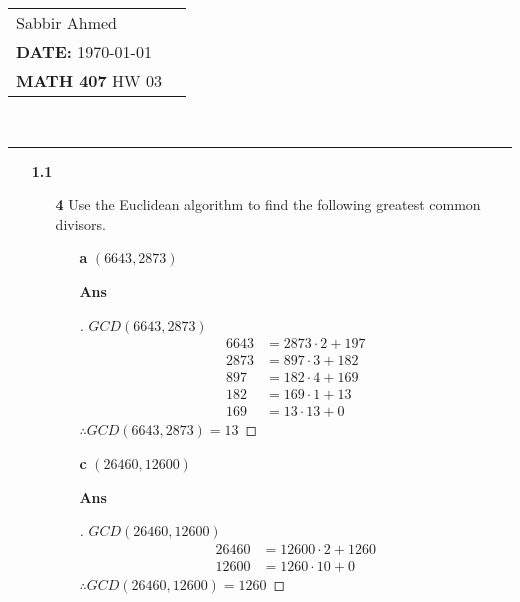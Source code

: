 \documentclass[paper=usletter, fontsize=12pt]{article}
\newcommand{\documentinfo}[5]{
    \begin{centering}
        \parbox{2in}{
        \begin{spacing}{1}
            \begin{flushleft}
                \begin{tabular}{l l}
                    #1 \\
                    #2 \\
                    #3 \\
                \end{tabular}\\
                \rule{\textwidth}{1pt}
            \end{flushleft}
        \end{spacing}
        }
    \end{centering}
}
\begin{document}
    \documentinfo{Sabbir Ahmed}{\textbf{DATE:} \today}{\textbf{MATH 407} HW 03}
    \vspace{-0.2in}

    \begin{itemize}

        \item[\textbf{1.1}]

        \begin{itemize}

            \item[\textbf{4}] Use the Euclidean algorithm to find the
            following greatest common divisors.

            \begin{itemize}

                \item[\textbf{a}] $(6643, 2873)$
                \item[\textbf{Ans}]
                \begin{proof}[\unskip\nopunct]
                    $GCD(6643, 2873)$
                    \begin{align*}
                        6643 & = 2873 \cdot 2 + 197 \\
                        2873 & = 897 \cdot 3 + 182 \\
                        897 & = 182 \cdot 4 + 169 \\
                        182 & = 169 \cdot 1 + 13 \\
                        169 & = 13 \cdot 13 + 0
                    \end{align*}
                    $\therefore GCD(6643, 2873) = 13$ \qedhere
                \end{proof}
                \vspace{0.2in}

                \item[\textbf{c}] $(26460, 12600)$
                \item[\textbf{Ans}]
                \begin{proof}[\unskip\nopunct]
                    $GCD(26460, 12600)$
                    \begin{align*}
                        26460 & = 12600 \cdot 2 + 1260 \\
                        12600 & = 1260 \cdot 10 + 0
                    \end{align*}
                    $\therefore GCD(26460, 12600) = 1260$ \qedhere
                \end{proof}
                \vspace{0.2in}


\end{itemize}
\end{itemize}
\end{itemize}
\end{document}
